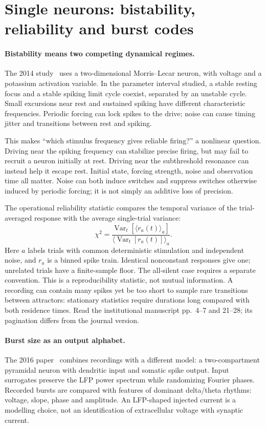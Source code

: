 \documentclass[11pt,a4paper]{article}
\begin{document}
\section{Single neurons: bistability, reliability and burst codes}
\paragraph{Bistability means two competing dynamical regimes.}
The 2014 study~\cite{bistable} uses a two-dimensional Morris--Lecar neuron, with voltage and a potassium activation variable. In the parameter interval studied, a stable resting focus and a stable spiking limit cycle coexist, separated by an unstable cycle. Small excursions near rest and sustained spiking have different characteristic frequencies. Periodic forcing can lock spikes to the drive; noise can cause timing jitter and transitions between rest and spiking.

This makes ``which stimulus frequency gives reliable firing?'' a nonlinear question. Driving near the spiking frequency can stabilize precise firing, but may fail to recruit a neuron initially at rest. Driving near the subthreshold resonance can instead help it escape rest. Initial state, forcing strength, noise and observation time all matter. Noise can both induce switches and suppress switches otherwise induced by periodic forcing; it is not simply an additive loss of precision.

The operational reliability statistic compares the temporal variance of the trial-averaged response with the average single-trial variance:
\[\chi^2=\frac{\operatorname{Var}_t[\langle r_a(t)\rangle_a]}{\langle\operatorname{Var}_t[r_a(t)]\rangle_a}.\]
Here $a$ labels trials with common deterministic stimulation and independent noise, and $r_a$ is a binned spike train. Identical nonconstant responses give one; unrelated trials have a finite-sample floor. The all-silent case requires a separate convention. This is a reproducibility statistic, not mutual information. A recording can contain many spikes yet be too short to sample rare transitions between attractors: stationary statistics require durations long compared with both residence times. Read the institutional manuscript pp.~4--7 and 21--28; its pagination differs from the journal version.

\paragraph{Burst size as an output alphabet.}
The 2016 paper~\cite{burst} combines recordings with a different model: a two-compartment pyramidal neuron with dendritic input and somatic spike output. Input surrogates preserve the LFP power spectrum while randomizing Fourier phases. Recorded bursts are compared with features of dominant delta/theta rhythms: voltage, slope, phase and amplitude. An LFP-shaped injected current is a modelling choice, not an identification of extracellular voltage with synaptic current.
\end{document}
